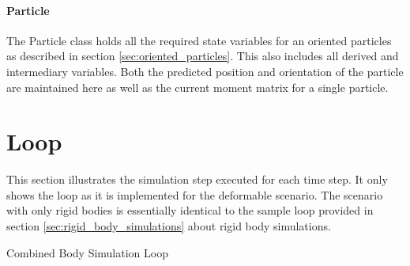 \paragraph{Particle}
The Particle class holds all the required state variables for an oriented particles as described in section \ref{sec:oriented_particles}. This also includes all derived and intermediary variables. Both the predicted position and orientation of the particle are maintained here as well as the current moment matrix for a single particle.

\section{Loop}

This section illustrates the simulation step executed for each time step. It only shows the loop as it is implemented for the deformable scenario. The scenario with only rigid bodies is essentially identical to the sample loop provided in section \ref{sec:rigid_body_simulations} about rigid body simulations.

\begin{algorithm}[htbp!]
\caption{Combined Body Simulation Loop}
\begin{algorithmic}[1]
\ENDFOR
{}
	\ENDFOR
	\ENDFOR
\ENDFOR
{}
		\ENDFOR
	\ENDFOR
\ENDFOR
{}
	\ENDFOR
\ENDFOR
{}
\ENDFOR

\ENDFOR
\end{algorithmic}
\end{algorithm}
